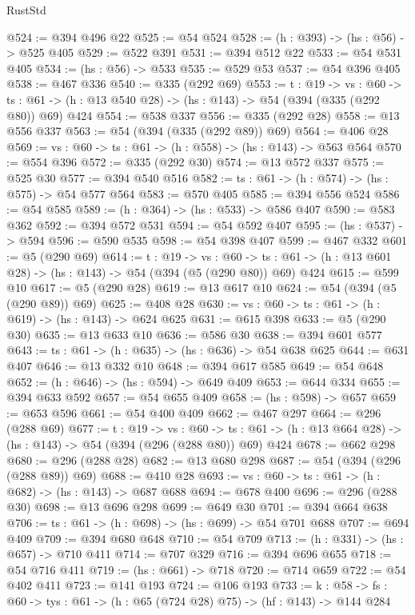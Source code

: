 \begin{lexlean}{RustStd}
\begin{coremodule}
@524 := @394 @496 @22
@525 := @54 @524
@528 := (h : @393) -> (hs : @56) -> @525 @405
@529 := @522 @391
@531 := @394 @512 @22
@533 := @54 @531 @405
@534 := (hs : @56) -> @533
@535 := @529 @53
@537 := @54 @396 @405
@538 := @467 @336
@540 := @335 (@292 @69)
@553 := {t : @19} ->
  {vs : @60} ->
  {ts : @61} -> (h : @13 @540 @28) -> (hs : @143) -> @54 (@394 (@335 (@292 @80)) @69) @424
@554 := @538 @337
@556 := @335 (@292 @28)
@558 := @13 @556 @337
@563 := @54 (@394 (@335 (@292 @89)) @69)
@564 := @406 @28
@569 := {vs : @60} -> {ts : @61} -> (h : @558) -> (hs : @143) -> @563 @564
@570 := @554 @396
@572 := @335 (@292 @30)
@574 := @13 @572 @337
@575 := @525 @30
@577 := @394 @540 @516
@582 := {ts : @61} -> (h : @574) -> (hs : @575) -> @54 @577 @564
@583 := @570 @405
@585 := @394 @556 @524
@586 := @54 @585
@589 := (h : @364) -> (hs : @533) -> @586 @407
@590 := @583 @362
@592 := @394 @572 @531
@594 := @54 @592 @407
@595 := (hs : @537) -> @594
@596 := @590 @535
@598 := @54 @398 @407
@599 := @467 @332
@601 := @5 (@290 @69)
@614 := {t : @19} ->
  {vs : @60} ->
  {ts : @61} -> (h : @13 @601 @28) -> (hs : @143) -> @54 (@394 (@5 (@290 @80)) @69) @424
@615 := @599 @10
@617 := @5 (@290 @28)
@619 := @13 @617 @10
@624 := @54 (@394 (@5 (@290 @89)) @69)
@625 := @408 @28
@630 := {vs : @60} -> {ts : @61} -> (h : @619) -> (hs : @143) -> @624 @625
@631 := @615 @398
@633 := @5 (@290 @30)
@635 := @13 @633 @10
@636 := @586 @30
@638 := @394 @601 @577
@643 := {ts : @61} -> (h : @635) -> (hs : @636) -> @54 @638 @625
@644 := @631 @407
@646 := @13 @332 @10
@648 := @394 @617 @585
@649 := @54 @648
@652 := (h : @646) -> (hs : @594) -> @649 @409
@653 := @644 @334
@655 := @394 @633 @592
@657 := @54 @655 @409
@658 := (hs : @598) -> @657
@659 := @653 @596
@661 := @54 @400 @409
@662 := @467 @297
@664 := @296 (@288 @69)
@677 := {t : @19} ->
  {vs : @60} ->
  {ts : @61} -> (h : @13 @664 @28) -> (hs : @143) -> @54 (@394 (@296 (@288 @80)) @69) @424
@678 := @662 @298
@680 := @296 (@288 @28)
@682 := @13 @680 @298
@687 := @54 (@394 (@296 (@288 @89)) @69)
@688 := @410 @28
@693 := {vs : @60} -> {ts : @61} -> (h : @682) -> (hs : @143) -> @687 @688
@694 := @678 @400
@696 := @296 (@288 @30)
@698 := @13 @696 @298
@699 := @649 @30
@701 := @394 @664 @638
@706 := {ts : @61} -> (h : @698) -> (hs : @699) -> @54 @701 @688
@707 := @694 @409
@709 := @394 @680 @648
@710 := @54 @709
@713 := (h : @331) -> (hs : @657) -> @710 @411
@714 := @707 @329
@716 := @394 @696 @655
@718 := @54 @716 @411
@719 := (hs : @661) -> @718
@720 := @714 @659
@722 := @54 @402 @411
@723 := @141 @193
@724 := @106 @193
@733 := {k : @58} ->
  {fs : @60} -> {tys : @61} -> (h : @65 (@724 @28) @75) -> (hf : @143) -> @144 @284

\end{coremodule}
\end{lexlean}
